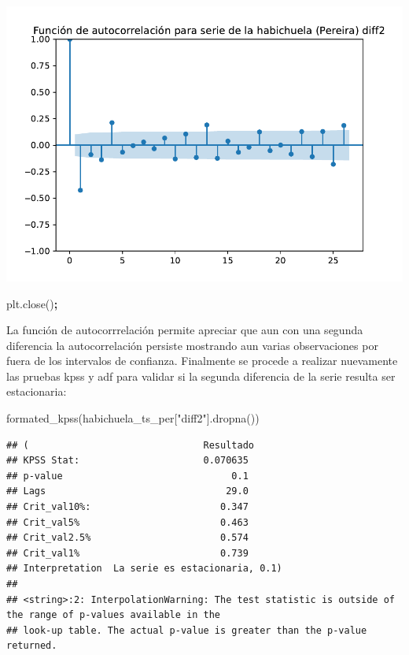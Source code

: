 \documentclass[
]{book}
\newenvironment{Shaded}{\begin{snugshade}}{\end{snugshade}}
\newcommand{\NormalTok}[1]{#1}
\newcommand{\OperatorTok}[1]{\textcolor[rgb]{0.81,0.36,0.00}{\textbf{#1}}}
\newcommand{\StringTok}[1]{\textcolor[rgb]{0.31,0.60,0.02}{#1}}
\begin{document}
\includegraphics{bookdown-demo_files/figure-latex/unnamed-chunk-116-103.pdf}

\begin{Shaded}
\begin{Highlighting}[]
\NormalTok{plt.close()}\OperatorTok{;}
\end{Highlighting}
\end{Shaded}

La función de autocorrrelación permite apreciar que aun con una segunda diferencia la autocorrelación persiste mostrando aun varias observaciones por fuera de los intervalos de confianza. Finalmente se procede a realizar nuevamente las pruebas kpss y adf para validar si la segunda diferencia de la serie resulta ser estacionaria:

\begin{Shaded}
\begin{Highlighting}[]
\NormalTok{formated\_kpss(habichuela\_ts\_per[}\StringTok{"diff2"}\NormalTok{].dropna())}
\end{Highlighting}
\end{Shaded}

\begin{verbatim}
## (                               Resultado
## KPSS Stat:                      0.070635
## p-value                              0.1
## Lags                                29.0
## Crit_val10%:                       0.347
## Crit_val5%                         0.463
## Crit_val2.5%                       0.574
## Crit_val1%                         0.739
## Interpretation  La serie es estacionaria, 0.1)
## 
## <string>:2: InterpolationWarning: The test statistic is outside of the range of p-values available in the
## look-up table. The actual p-value is greater than the p-value returned.
\end{verbatim}
\end{document}
